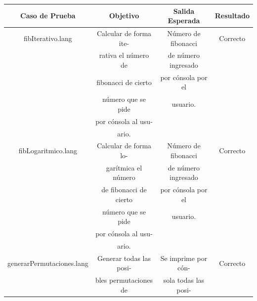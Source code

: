 \documentclass[11pt, spanish]{report}
\begin{document}
\begin{itemize}
  \begin{table}[!hbp]
    \begin{tabular}{c c c c}
      \hline            
      \hline            
      Caso de Prueba              & Objetivo               & Salida Esperada & Resultado \\ [0.5ex]
      \hline                          
      fibIterativo.lang           & Calcular de forma ite- & N\'umero de fibonacci & Correcto                    \\ [1ex] 
                                  & rativa el n\'umero de  & de n\'umero ingresado &                             \\ [1ex] 
                                  & fibonacci de cierto    & por c\'onsola por el  &                             \\ [1ex] 
                                  & n\'umero que se pide   & usuario.              &                             \\ [1ex] 
                                  & por c\'onsola al usu-  &                       &                             \\ [1ex]   
                                  & ario.                  &                       &                             \\ [1ex]   
      fibLogaritmico.lang         & Calcular de forma lo-  & N\'umero de fibonacci & Correcto                    \\ [1ex] 
                                  & gar\'itmica el n\'umero& de n\'umero ingresado &                             \\ [1ex] 
                                  & de fibonacci de cierto & por c\'onsola por el  &                             \\ [1ex] 
                                  & n\'umero que se pide   & usuario.              &                             \\ [1ex] 
                                  & por c\'onsola al usu-  &                       &                             \\ [1ex]   
                                  & ario.                  &                       &                             \\ [1ex]   
      generarPermutaciones.lang   & Generar todas las posi-& Se imprime por c\'on- & Correcto                    \\ [1ex] 
                                  & bles permutaciones de  & sola todas las posi-  &                             \\ [1ex] 

\end{tabular}
\end{table}
\end{itemize}
\end{document}
